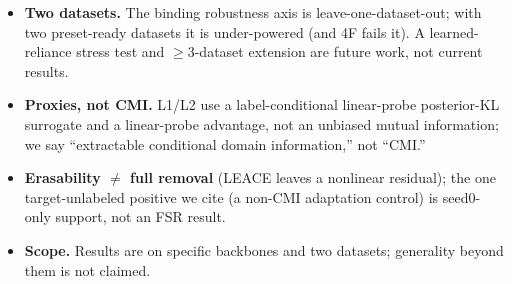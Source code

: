 \begin{itemize}
to test the machinery; they do not speak to natural or learned reliance, and must not be conflated with
the natural refusal (\S\ref{sec:rq4}).
\item \textbf{Two datasets.} The binding robustness axis is leave-one-dataset-out; with two preset-ready
datasets it is under-powered (and 4F fails it). A learned-reliance stress test and $\geq 3$-dataset
extension are future work, not current results.
\item \textbf{Proxies, not CMI.} L1/L2 use a label-conditional linear-probe posterior-KL surrogate and
a linear-probe advantage, not an unbiased mutual information; we say ``extractable conditional domain
information,'' not ``CMI.''
\item \textbf{Erasability $\neq$ full removal} (LEACE leaves a nonlinear residual); the one
target-unlabeled positive we cite (a non-CMI adaptation control) is seed0-only support, not an FSR
result.
\item \textbf{Scope.} Results are on specific backbones and two datasets; generality beyond them is not
claimed.
\end{itemize}
